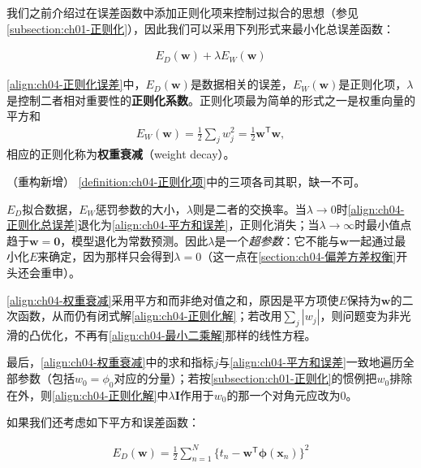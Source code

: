 \documentclass[../../main.tex]{subfiles}
\begin{document}
我们之前介绍过在误差函数中添加正则化项来控制过拟合的思想（参见\cref{subsection:ch01-正则化}），因此我们可以采用下列形式来最小化总误差函数：

\begin{align}
  E_D(\boldsymbol{w})+\lambda E_W(\boldsymbol{w})
  \label{align:ch04-正则化误差}
\end{align}

\begin{definition}[正则化项与权重衰减]\label{definition:ch04-正则化项}
\eqref{align:ch04-正则化误差}中，$E_D(\boldsymbol{w})$是数据相关的误差，$E_W(\boldsymbol{w})$是正则化项，$\lambda$是控制二者相对重要性的\textbf{正则化系数}。正则化项最为简单的形式之一是权重向量的平方和
\begin{align}
  E_W(\boldsymbol{w})=\frac{1}{2}\sum_{j}w_j^2=\frac{1}{2}\boldsymbol{w}^{\mathsf{T}}\boldsymbol{w},
  \label{align:ch04-权重衰减}
\end{align}
相应的正则化称为\textbf{权重衰减}（weight decay）。
\end{definition}

\begin{remark}（重构新增）
\cref{definition:ch04-正则化项}中的三项各司其职，缺一不可。

$E_D$拟合数据，$E_W$惩罚参数的大小，$\lambda$则是二者的交换率。当$\lambda\to0$时\eqref{align:ch04-正则化总误差}退化为\eqref{align:ch04-平方和误差}，正则化消失；当$\lambda\to\infty$时最小值点趋于$\boldsymbol{w}=\boldsymbol{0}$，模型退化为常数预测。因此$\lambda$是一个\emph{超参数}：它不能与$\boldsymbol{w}$一起通过最小化$E$来确定，因为那样只会得到$\lambda=0$（这一点在\cref{section:ch04-偏差方差权衡}开头还会重申）。

\eqref{align:ch04-权重衰减}采用平方和而非绝对值之和，原因是平方项使$E$保持为$\boldsymbol{w}$的二次函数，从而仍有闭式解\eqref{align:ch04-正则化解}；若改用$\sum_j|w_j|$，则问题变为非光滑的凸优化，不再有\eqref{align:ch04-最小二乘解}那样的线性方程。

最后，\eqref{align:ch04-权重衰减}中的求和指标$j$与\eqref{align:ch04-平方和误差}一致地遍历全部参数（包括$w_0=\phi_0$对应的分量）；若按\cref{subsection:ch01-正则化}的惯例把$w_0$排除在外，则\eqref{align:ch04-正则化解}中$\lambda\boldsymbol{I}$作用于$w_0$的那一个对角元应改为$0$。
\end{remark}

如果我们还考虑如下平方和误差函数：

\begin{align}
  E_D(\boldsymbol{w})=\frac{1}{2}\sum_{n=1}^{N}\bigl\{t_n-\boldsymbol{w}^{\mathsf{T}}\boldsymbol{\phi}(\boldsymbol{x}_n)\bigr\}^2
  \label{align:ch04-平方和误差重述}
\end{align}
\end{document}
